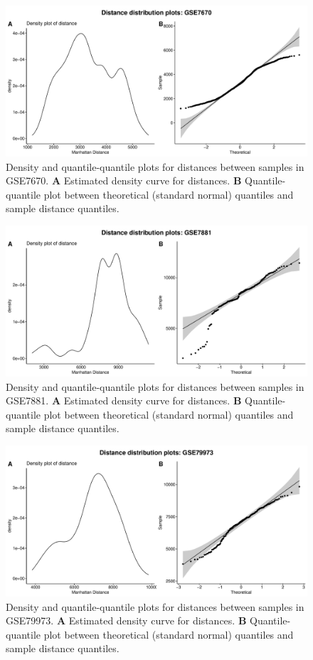 \documentclass[10pt,letterpaper]{article}\usepackage[]{graphicx}\usepackage[]{color}
\begin{document}
\begin{figure}[H]
	\includegraphics[width=\textwidth]{manhattan-distance_hist_GSE7670.pdf}
	\caption{Density and quantile-quantile plots for distances between samples in GSE7670. \textbf{A} Estimated density curve for distances. \textbf{B} Quantile-quantile plot between theoretical (standard normal) quantiles and sample distance quantiles.}
\end{figure}

\begin{figure}[H]
	\includegraphics[width=\textwidth]{manhattan-distance_hist_GSE7881.pdf}
	\caption{Density and quantile-quantile plots for distances between samples in GSE7881. \textbf{A} Estimated density curve for distances. \textbf{B} Quantile-quantile plot between theoretical (standard normal) quantiles and sample distance quantiles.}
\end{figure}

\begin{figure}[H]
	\includegraphics[width=\textwidth]{manhattan-distance_hist_GSE79973.pdf}
	\caption{Density and quantile-quantile plots for distances between samples in GSE79973. \textbf{A} Estimated density curve for distances. \textbf{B} Quantile-quantile plot between theoretical (standard normal) quantiles and sample distance quantiles.}
\end{figure}
\end{document}

